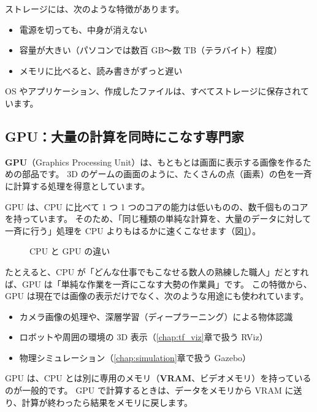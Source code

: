 ストレージには、次のような特徴があります。

\begin{itemize}
  \item 電源を切っても、中身が消えない
  \item 容量が大きい（パソコンでは数百 GB〜数 TB（テラバイト）程度）
  \item メモリに比べると、読み書きがずっと遅い
\end{itemize}

OS やアプリケーション、作成したファイルは、すべてストレージに保存されています。

\subsection{GPU：大量の計算を同時にこなす専門家}

\textbf{GPU}（Graphics Processing Unit）は、もともとは画面に表示する画像を作るための部品です。
3D のゲームの画面のように、たくさんの点（画素）の色を一斉に計算する処理を得意としています。

GPU は、CPU に比べて 1 つ 1 つのコアの能力は低いものの、数千個ものコアを持っています。
そのため、「同じ種類の単純な計算を、大量のデータに対して一斉に行う」処理を CPU よりもはるかに速くこなせます（図\ref{fig:computer-cpu-gpu}）。

\begin{figure}[tb]
  \centering
  
  \caption{CPU と GPU の違い}
  \label{fig:computer-cpu-gpu}
\end{figure}

たとえると、CPU が「どんな仕事でもこなせる数人の熟練した職人」だとすれば、GPU は「単純な作業を一斉にこなす大勢の作業員」です。
この特徴から、GPU は現在では画像の表示だけでなく、次のような用途にも使われています。

\begin{itemize}
  \item カメラ画像の処理や、深層学習（ディープラーニング）による物体認識
  \item ロボットや周囲の環境の 3D 表示（\ref{chap:tf_viz}章で扱う RViz）
  \item 物理シミュレーション（\ref{chap:simulation}章で扱う Gazebo）
\end{itemize}

GPU は、CPU とは別に専用のメモリ（\textbf{VRAM}、ビデオメモリ）を持っているのが一般的です。
GPU で計算するときは、データをメモリから VRAM に送り、計算が終わったら結果をメモリに戻します。

